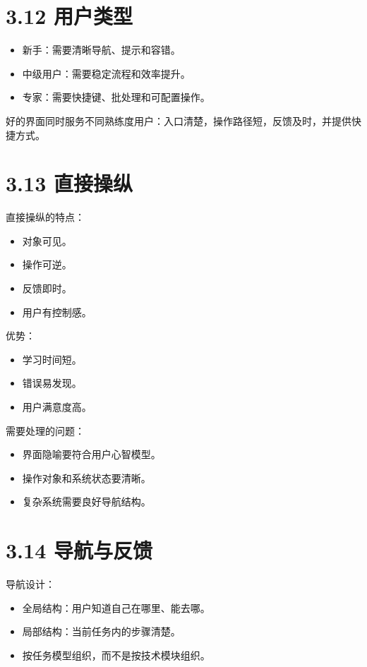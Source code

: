 \documentclass[UTF8,zihao=-4]{ctexart}
\begin{document}
\section{3.12 用户类型}

\begin{itemize}
\item 新手：需要清晰导航、提示和容错。
\item 中级用户：需要稳定流程和效率提升。
\item 专家：需要快捷键、批处理和可配置操作。
\end{itemize}

好的界面同时服务不同熟练度用户：入口清楚，操作路径短，反馈及时，并提供快捷方式。

\section{3.13 直接操纵}

直接操纵的特点：

\begin{itemize}
\item 对象可见。
\item 操作可逆。
\item 反馈即时。
\item 用户有控制感。
\end{itemize}

优势：

\begin{itemize}
\item 学习时间短。
\item 错误易发现。
\item 用户满意度高。
\end{itemize}

需要处理的问题：

\begin{itemize}
\item 界面隐喻要符合用户心智模型。
\item 操作对象和系统状态要清晰。
\item 复杂系统需要良好导航结构。
\end{itemize}

\section{3.14 导航与反馈}

导航设计：

\begin{itemize}
\item 全局结构：用户知道自己在哪里、能去哪。
\item 局部结构：当前任务内的步骤清楚。
\item 按任务模型组织，而不是按技术模块组织。
\end{itemize}
\end{document}

